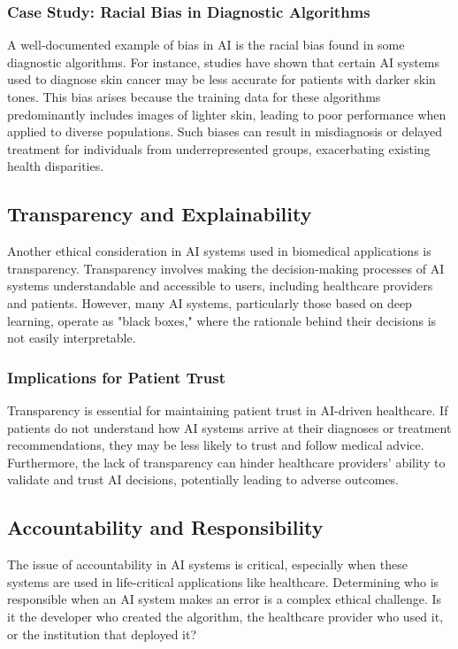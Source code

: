 \documentclass{article}
\begin{document}
\subsubsection{Case Study: Racial Bias in Diagnostic Algorithms}
A well-documented example of bias in AI is the racial bias found in some diagnostic algorithms. For instance, studies have shown that certain AI systems used to diagnose skin cancer may be less accurate for patients with darker skin tones. This bias arises because the training data for these algorithms predominantly includes images of lighter skin, leading to poor performance when applied to diverse populations. Such biases can result in misdiagnosis or delayed treatment for individuals from underrepresented groups, exacerbating existing health disparities.

\subsection{Transparency and Explainability}
Another ethical consideration in AI systems used in biomedical applications is transparency. Transparency involves making the decision-making processes of AI systems understandable and accessible to users, including healthcare providers and patients. However, many AI systems, particularly those based on deep learning, operate as "black boxes," where the rationale behind their decisions is not easily interpretable.

\subsubsection{Implications for Patient Trust}
Transparency is essential for maintaining patient trust in AI-driven healthcare. If patients do not understand how AI systems arrive at their diagnoses or treatment recommendations, they may be less likely to trust and follow medical advice. Furthermore, the lack of transparency can hinder healthcare providers' ability to validate and trust AI decisions, potentially leading to adverse outcomes.

\subsection{Accountability and Responsibility}
The issue of accountability in AI systems is critical, especially when these systems are used in life-critical applications like healthcare. Determining who is responsible when an AI system makes an error is a complex ethical challenge. Is it the developer who created the algorithm, the healthcare provider who used it, or the institution that deployed it?
\end{document}
